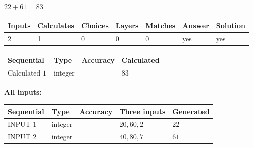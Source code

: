\documentclass{ctexart}
\begin{document}
$ %
22 +  %
61=   %
83$
 
 
\noindent{}
 
 

 
   
   
   
   
\noindent\begin{tabular}{|l|l|l|l|l|l|l|}
 \hline
Inputs & Calculates & Choices & Layers & Matches & Answer & Solution \\ \hline
 2  & 
 1  & 
 0
  & 
 0  & 
 0  & 
  yes & 
  yes 
  \\ \hline
 \end{tabular}
   
   
   
   
\noindent{}
   
   
  
  
\noindent\begin{tabular}{|l|l|l|l|}
\hline
 Sequential & Type & Accuracy & Calculated \\ 
\hline
 
 
  Calculated $  1 $ & integer &  & 
  $ 83 $ 
 \\  \hline  
 \end{tabular}
   
   
   
   
\noindent\vspace{0.1in}\hspace{-0.08in} {\textbf{\Large{All inputs: }}}
   
   
  
  
\noindent\begin{tabular}{|l|l|l|l|l|}
\hline
 Sequential & Type & Accuracy & Three inputs & Generated \\ 
\hline
 
 
  INPUT $  1 $ & integer &  & $
 20
 , 
 60
 , 
 2
 $ & $ 22 $ 
 \\  \hline  
 
 
  INPUT $  2 $ & integer &  & $
 40
 , 
 80
 , 
 7
 $ & $ 61 $ 
 \\  \hline  
 \end{tabular}
   
   
   
   
   
   
 \vspace{0.2in}
 
   
   
\end{document}
